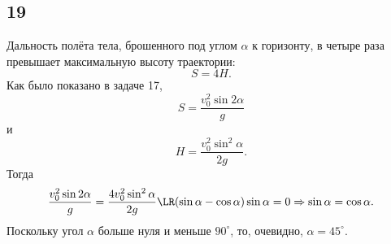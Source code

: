 \subsection{19}

Дальность полёта тела, брошенного под углом $\alpha$ к горизонту, в четыре раза превышает максимальную высоту траектории:
\[
S=4H.
\]
Как было показано в задаче 17,
\[
S=\frac{v_0^2\sin2\alpha}{g}
\]
и
\[
H=\frac{v_0^2\sin^2\alpha}{2g}.
\]
Тогда
\[
\frac{v_0^2\sin2\alpha}{g}=\frac{4v_0^2\sin^2\alpha}{2g}\LR(\sin\alpha-\cos\alpha)\sin\alpha=0\Rightarrow\sin\alpha=\cos\alpha.
\]
Поскольку угол $\alpha$ больше нуля и меньше $90^\circ$, то, очевидно, $\alpha=45^\circ$.